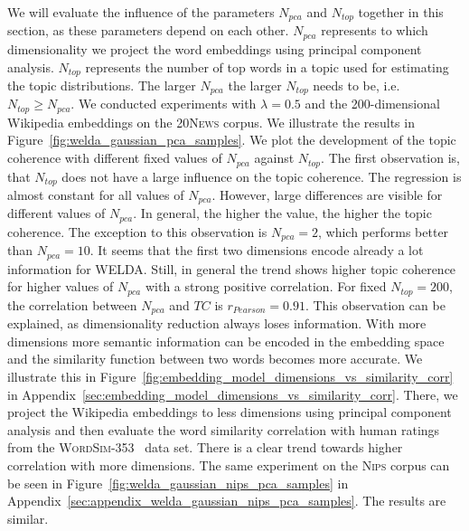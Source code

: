 \documentclass[
        a4paper,
        titlepage,
        twoside,
        parskip,
        numbers=noenddot
        ]{scrbook}
\theoremstyle{break}
\begin{document}
We will evaluate the influence of the parameters $N_{pca}$ and $N_{top}$ together in this section, as these parameters depend on each other.
$N_{pca}$ represents to which dimensionality we project the word embeddings using principal component analysis.
$N_{top}$ represents the number of top words in a topic used for estimating the topic distributions.
The larger $N_{pca}$ the larger $N_{top}$ needs to be, i.e. $N_{top} \geq N_{pca}$.
We conducted experiments with $\lambda = 0.5$ and the 200-dimensional Wikipedia embeddings on the \textsc{20News} corpus.
We illustrate the results in Figure~\ref{fig:welda_gaussian_pca_samples}.
We plot the development of the topic coherence with different fixed values of $N_{pca}$ against $N_{top}$.
The first observation is, that $N_{top}$ does not have a large influence on the topic coherence.
The regression is almost constant for all values of $N_{pca}$.
However, large differences are visible for different values of $N_{pca}$.
In general, the higher the value, the higher the topic coherence.
The exception to this observation is $N_{pca} = 2$, which performs better than $N_{pca} = 10$.
It seems that the first two dimensions encode already a lot information for WELDA.
Still, in general the trend shows higher topic coherence for higher values of $N_{pca}$ with a strong positive correlation.
For fixed $N_{top} = 200$, the correlation between $N_{pca}$ and $TC$ is $r_{Pearson} = 0.91$.
This observation can be explained, as dimensionality reduction always loses information.
With more dimensions more semantic information can be encoded in the embedding space and the similarity function between two words becomes more accurate.
We illustrate this in Figure~\ref{fig:embedding_model_dimensions_vs_similarity_corr} in Appendix~\ref{sec:embedding_model_dimensions_vs_similarity_corr}.
There, we project the Wikipedia embeddings to less dimensions using principal component analysis and then evaluate the word similarity correlation with human ratings from the \textsc{WordSim-353}~\cite{Agirre2009} data set.
There is a clear trend towards higher correlation with more dimensions.
The same experiment on the \textsc{Nips} corpus can be seen in Figure~\ref{fig:welda_gaussian_nips_pca_samples} in Appendix~\ref{sec:appendix_welda_gaussian_nips_pca_samples}.
The results are similar.
\end{document}
